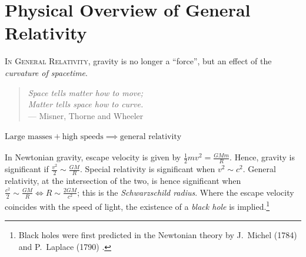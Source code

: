 { %
\renewcommand{\thechapter}{\arabic{chapter}} %
\chapter{Physical Overview of General Relativity}
}

\textsc{In General Relativity}, gravity is no longer a ``force'', but an effect of the \emph{curvature of spacetime}.

\begin{quote}
	\emph{Space tells matter how to move; \\
	\hspace*{1em} Matter tells space how to curve.} \\
	\hspace*{2em} --- Misner, Thorne and Wheeler
\end{quote}

\begin{center}
\end{center}

\subsubsection*{$\text{Large masses} + \text{high speeds} \implies \text{general relativity}$}
In Newtonian gravity, escape velocity is given by $\frac12mv^2 = \frac{GMm}{R}$.
Hence, gravity is significant if $\frac{v^2}{2} \sim \frac{GM}{R}$.
Special relativity is significant when $v^2 \sim c^2$.
General relativity, at the intersection of the two, is hence significant when $\frac{c^2}{2} \sim \frac{GM}{R} \iff R \sim \frac{2GM}{c^2}$; this is the \emph{Schwarzschild radius}.
Where the escape velocity coincides with the speed of light, the existence of a \emph{black hole} is implied.\footnote{
	Black holes were first predicted in the Newtonian theory by J.\ Michel (1784) and P.\ Laplace (1790) \cite{montgomery2009michell}.
}

